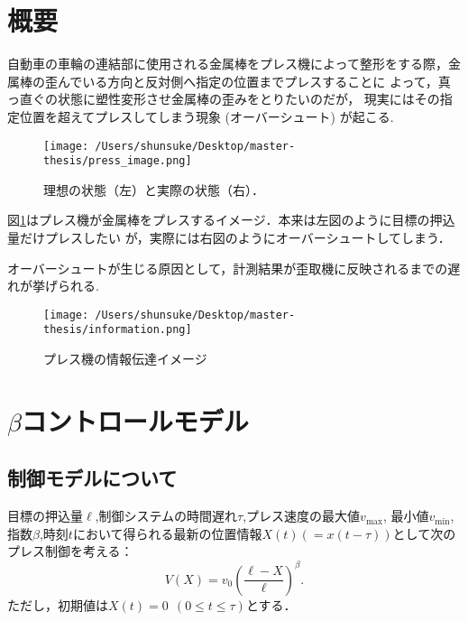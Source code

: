 \documentclass [dvipdfmx] {jsarticle}
\numberwithin{equation}{section}
\theoremstyle{definition} %
\theoremstyle{definition} %
\begin{document}
\section{概要}
自動車の車輪の連結部に使用される金属棒をプレス機によって整形をする際，金属棒の歪んでいる方向と反対側へ指定の位置までプレスすることに
よって，真っ直ぐの状態に塑性変形させ金属棒の歪みをとりたいのだが，
現実にはその指定位置を超えてプレスしてしまう現象 (オーバーシュート) が起こる.
\begin{figure}[hbt]
    \centering
    \texttt{[image: /Users/shunsuke/Desktop/master-thesis/press\_image.png]}
    \caption{理想の状態（左）と実際の状態（右）．}
    \label{press_image}
\end{figure}
\newpage

図\ref{press_image}はプレス機が金属棒をプレスするイメージ．本来は左図のように目標の押込量だけプレスしたい
が，実際には右図のようにオーバーシュートしてしまう．

オーバーシュートが生じる原因として，計測結果が歪取機に反映されるまでの遅れが挙げられる.
\begin{figure}[hbt]
    \centering
    \texttt{[image: /Users/shunsuke/Desktop/master-thesis/information.png]}
    \caption{プレス機の情報伝達イメージ}
    \label{info_image}
\end{figure}

\section{$\beta$コントロールモデル}
\subsection{制御モデルについて}
目標の押込量$\ell$,制御システムの時間遅れ$\tau$,プレス速度の最大値$v_{\max}$,
最小値$v_{\min}$,指数$\beta$,時刻$t$において得られる最新の位置情報$X(t)(=x(t-\tau))$として次のプレス制御を考える：
\begin{equation}\label{eq:betamodel}
    V(X)=v_0\left(\frac{\ell-X}{\ell}\right)^\beta.
\end{equation}
ただし，初期値は$X(t)=0\ \ (0\le t\le\tau)$とする．
\end{document}
